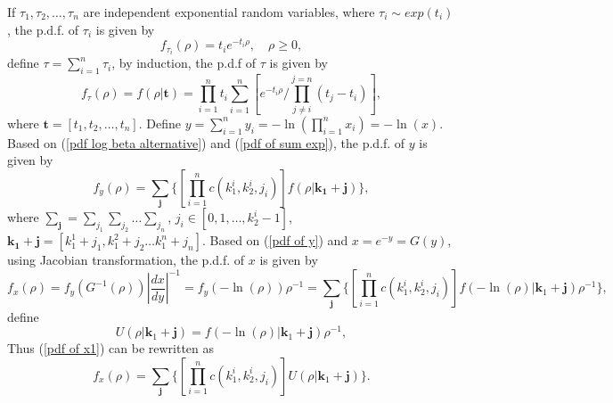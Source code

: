\documentclass[12pt, draftclsnofoot, onecolumn]{IEEEtran}
\begin{document}
If $\tau_{1}, \tau_{2}, \ldots, \tau_{n}$ are independent exponential random variables, where $\tau_{i}\sim exp(t_{i})$, the p.d.f. of $\tau_{i}$ is given by 
\begin{equation}
f_{\tau_{i}}(\rho)=t_{i}e^{-t_{i}\rho}, \quad\rho\geq 0, 
\label{pdf exp}
\end{equation}
define $\tau=\sum_{i=1}^{n}\tau_{i}$, by induction, the p.d.f of $\tau$ is given by\cite{bhargava1981distribution}
\begin{equation}
f_{\tau}(\rho)=f(\rho|\mathbf{t})=\prod_{i=1}^{n}t_{i}\sum_{i=1}^{n}[e^{-t_{i}\rho}/\prod_{j\neq i}^{j=n}(t_{j}-t_{i})],
\label{pdf of sum exp}
\end{equation}
where $\mathbf{t}=[t_{1}, t_{2}, \ldots, t_{n}]$. Define $y=\sum_{i=1}^{n}y_{i}=-\ln(\prod_{i=1}^{n}x_{i})=-\ln(x)$. Based on (\ref{pdf log beta alternative}) and (\ref{pdf of sum exp}), the p.d.f. of $y$ is given by\cite{bhargava1981distribution}
\begin{equation}
f_{y}(\rho)=\sum_{\mathbf{j}}\{[\prod_{i=1}^{n}c(k_{1}^{i},k_{2}^{i}, j_{i})]f(\rho|\mathbf{k_{1}}+\mathbf{j})\},
\label{pdf of y}
\end{equation}
where $\sum_{\mathbf{j}}=\sum_{j_{1}}\sum_{j_{2}}\ldots \sum_{j_{n}}$, $j_{i}\in [0,1,\ldots, k^{i}_{2}-1]$, $\mathbf{k_{1}}+\mathbf{j}=[k_{1}^{1}+j_{1}, k_{1}^{2}+j_{2} \ldots k_{1}^{n}+j_{n}]$. Based on (\ref{pdf of y}) and $x=e^{-y}=G(y)$, using Jacobian transformation, the p.d.f. of $x$ is given by
\begin{equation}
f_{x}(\rho)=f_{y}(G^{-1}(\rho))|\frac{dx}{dy}|^{-1}=f_{y}(-\ln(\rho))\rho^{-1}=\sum_{\mathbf{j}}\{[\prod_{i=1}^{n}c(k_{1}^{i},k_{2}^{i}, j_{i})]f(-\ln(\rho)|\mathbf{k}_{1}+\mathbf{j})\rho^{-1}\},
\label{pdf of x1}
\end{equation} 
define 
\begin{equation}
U(\rho|\mathbf{k}_{1}+\mathbf{j})=f(-\ln(\rho)|\mathbf{k}_{1}+\mathbf{j})\rho^{-1},
\label{definition of U}
\end{equation}
Thus (\ref{pdf of x1}) can be rewritten as 
\begin{equation}
f_{x}(\rho)=\sum_{\mathbf{j}}\{[\prod_{i=1}^{n}c(k_{1}^{i},k_{2}^{i}, j_{i})]U(\rho|\mathbf{k}_{1}+\mathbf{j})\}.
\label{final pdf of x}
\end{equation}
\end{document}

